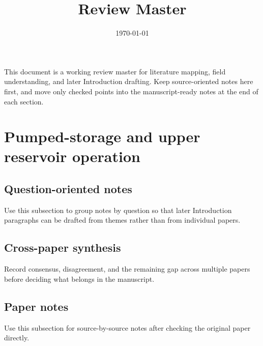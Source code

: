 \documentclass[11pt]{article}
\title{Review Master}
\author{}
\date{\today}
\begin{document}
\maketitle
\tableofcontents

This document is a working review master for literature mapping, field understanding, and later Introduction drafting. Keep source-oriented notes here first, and move only checked points into the manuscript-ready notes at the end of each section.

\section{Pumped-storage and upper reservoir operation}

\subsection{Question-oriented notes}
Use this subsection to group notes by question so that later Introduction paragraphs can be drafted from themes rather than from individual papers.
%

\subsection{Cross-paper synthesis}
Record consensus, disagreement, and the remaining gap across multiple papers before deciding what belongs in the manuscript.

\subsection{Paper notes}
Use this subsection for source-by-source notes after checking the original paper directly.
%
%
\end{document}
